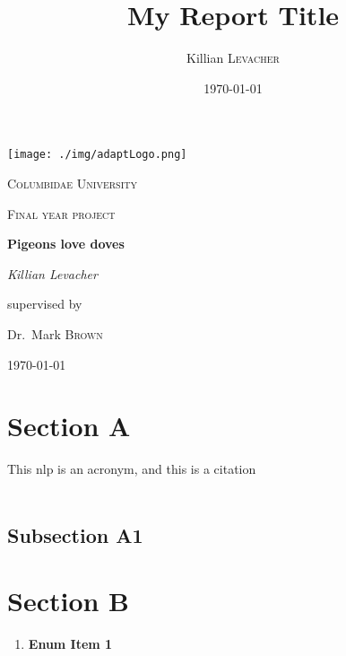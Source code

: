 \documentclass{article}
\title{My Report Title} %
\author{Killian \textsc{Levacher}} %
\date{\today} %
\begin{document}
\begin{titlepage}

	\centering
	\texttt{[image: ./img/adaptLogo.png]}\par\vspace{1cm}
	{\scshape\LARGE Columbidae University \par}
	\vspace{1cm}
	{\scshape\Large Final year project\par}
	\vspace{1.5cm}
	{\huge\bfseries Pigeons love doves\par}
	\vspace{2cm}
	{\Large\itshape Killian Levacher\par}
	\vfill
	supervised by\par
	Dr.~Mark \textsc{Brown}

	\vfill

	{\large \today\par}
\end{titlepage}





\newpage

\section{Section A}
\label{sectionLabel}

This \gls{nlp} is an acronym, and this \cite{Derczynski2015} is a citation \\ \\
\lipsum[1-2] 

\subsection{Subsection A1}
\lipsum[1-1] 

\section{Section B}



\begin{enumerate}[label=\bfseries \arabic*:]
  \item \textbf{Enum Item 1} \lipsum*[1-1] 

\end{enumerate}

 

\printbibliography

\end{document}
